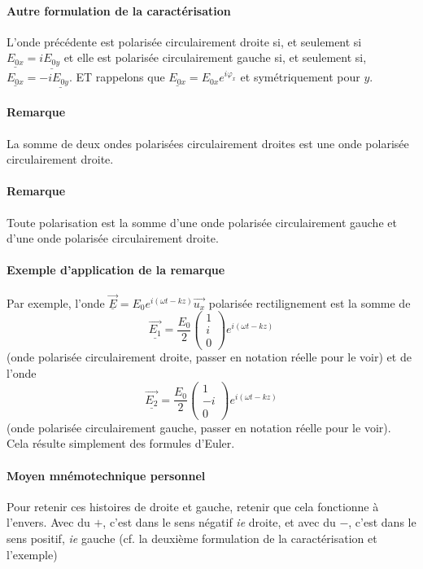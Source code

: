 \documentclass[french]{book}
\theoremstyle{plain}
\theoremstyle{definition}
\theoremstyle{remark}
\begin{document}
\paragraph{Autre formulation de la caractérisation} L'onde précédente est polarisée circulairement droite si, et seulement si $\underline{E_{0x}}=i\underline{E_{0y}}$ et elle est polarisée circulairement gauche si, et seulement si, $\underline{E_{0x}}=-i\underline{E_{0y}}$. ET rappelons que $\underline{E_{0x}}=E_{0x}e^{i\varphi_x}$ et symétriquement pour $y$.
\paragraph{Remarque} La somme de deux ondes polarisées circulairement droites est une onde polarisée circulairement droite.
\paragraph{Remarque} Toute polarisation est la somme d'une onde polarisée circulairement gauche et d'une onde polarisée circulairement droite.
\paragraph{Exemple d'application de la remarque} Par exemple, l'onde $\overrightarrow{\underline{E}}=E_0e^{i(\omega t-kz)}\overrightarrow{u_x}$ polarisée rectilignement est la somme de $$\overrightarrow{\underline{E_1}}=\frac{E_0}{2}\begin{pmatrix}
	1 \\
	i \\
	0
\end{pmatrix}e^{i(\omega t-kz)}$$ (onde polarisée circulairement droite, passer en notation réelle pour le voir) et de l'onde $$\overrightarrow{\underline{E_2}}=\frac{E_0}{2}\begin{pmatrix}
	1 \\
	-i \\
	0
\end{pmatrix}e^{i(\omega t-kz)}$$ (onde polarisée circulairement gauche, passer en notation réelle pour le voir). Cela résulte simplement des formules d'Euler.
\paragraph{Moyen mnémotechnique personnel} Pour retenir ces histoires de droite et gauche, retenir que cela fonctionne à l'envers. Avec du $+$, c'est dans le sens négatif \textit{ie} droite, et avec du $-$, c'est dans le sens positif, \textit{ie} gauche (cf. la deuxième formulation de la caractérisation et l'exemple)
\end{document}
